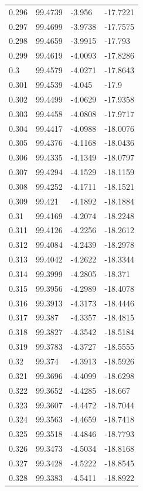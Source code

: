 \begin{tabular}{llll}
0.296 & 99.4739 & -3.956 & -17.7221 \\
0.297 & 99.4699 & -3.9738 & -17.7575 \\
0.298 & 99.4659 & -3.9915 & -17.793 \\
0.299 & 99.4619 & -4.0093 & -17.8286 \\
0.3 & 99.4579 & -4.0271 & -17.8643 \\
0.301 & 99.4539 & -4.045 & -17.9 \\
0.302 & 99.4499 & -4.0629 & -17.9358 \\
0.303 & 99.4458 & -4.0808 & -17.9717 \\
0.304 & 99.4417 & -4.0988 & -18.0076 \\
0.305 & 99.4376 & -4.1168 & -18.0436 \\
0.306 & 99.4335 & -4.1349 & -18.0797 \\
0.307 & 99.4294 & -4.1529 & -18.1159 \\
0.308 & 99.4252 & -4.1711 & -18.1521 \\
0.309 & 99.421 & -4.1892 & -18.1884 \\
0.31 & 99.4169 & -4.2074 & -18.2248 \\
0.311 & 99.4126 & -4.2256 & -18.2612 \\
0.312 & 99.4084 & -4.2439 & -18.2978 \\
0.313 & 99.4042 & -4.2622 & -18.3344 \\
0.314 & 99.3999 & -4.2805 & -18.371 \\
0.315 & 99.3956 & -4.2989 & -18.4078 \\
0.316 & 99.3913 & -4.3173 & -18.4446 \\
0.317 & 99.387 & -4.3357 & -18.4815 \\
0.318 & 99.3827 & -4.3542 & -18.5184 \\
0.319 & 99.3783 & -4.3727 & -18.5555 \\
0.32 & 99.374 & -4.3913 & -18.5926 \\
0.321 & 99.3696 & -4.4099 & -18.6298 \\
0.322 & 99.3652 & -4.4285 & -18.667 \\
0.323 & 99.3607 & -4.4472 & -18.7044 \\
0.324 & 99.3563 & -4.4659 & -18.7418 \\
0.325 & 99.3518 & -4.4846 & -18.7793 \\
0.326 & 99.3473 & -4.5034 & -18.8168 \\
0.327 & 99.3428 & -4.5222 & -18.8545 \\
0.328 & 99.3383 & -4.5411 & -18.8922 \\

\end{tabular}
